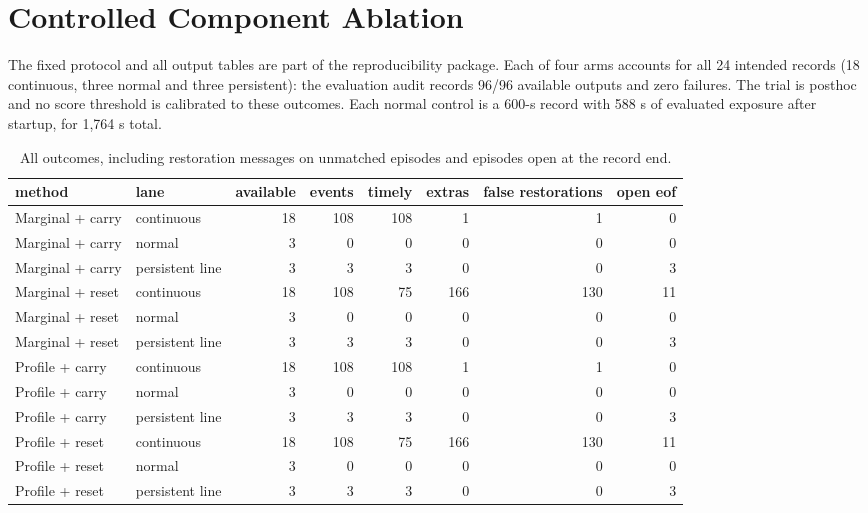 \section{Controlled Component Ablation}
\label{app:a01}
The fixed protocol and all output tables are part of the reproducibility package. Each of four arms accounts for all 24 intended records (18 continuous, three normal and three persistent): the evaluation audit records 96/96 available outputs and zero failures. The trial is posthoc and no score threshold is calibrated to these outcomes. Each normal control is a 600-s record with 588 s of evaluated exposure after startup, for 1,764 s total.
\begin{table}[t]\centering\scriptsize
\caption{All outcomes, including restoration messages on unmatched episodes and episodes open at the record end.}
\begin{tabular}{llrrrrrr}
\toprule
method & lane & available & events & timely & extras & false restorations & open eof \\
\midrule
Marginal + carry & continuous & 18 & 108 & 108 & 1 & 1 & 0 \\
Marginal + carry & normal & 3 & 0 & 0 & 0 & 0 & 0 \\
Marginal + carry & persistent line & 3 & 3 & 3 & 0 & 0 & 3 \\
Marginal + reset & continuous & 18 & 108 & 75 & 166 & 130 & 11 \\
Marginal + reset & normal & 3 & 0 & 0 & 0 & 0 & 0 \\
Marginal + reset & persistent line & 3 & 3 & 3 & 0 & 0 & 3 \\
Profile + carry & continuous & 18 & 108 & 108 & 1 & 1 & 0 \\
Profile + carry & normal & 3 & 0 & 0 & 0 & 0 & 0 \\
Profile + carry & persistent line & 3 & 3 & 3 & 0 & 0 & 3 \\
Profile + reset & continuous & 18 & 108 & 75 & 166 & 130 & 11 \\
Profile + reset & normal & 3 & 0 & 0 & 0 & 0 & 0 \\
Profile + reset & persistent line & 3 & 3 & 3 & 0 & 0 & 3 \\
\bottomrule
\end{tabular}
\end{table}
